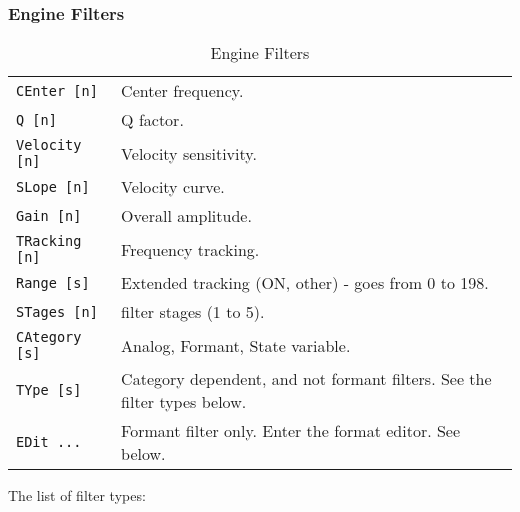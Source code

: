 \subsubsection{Engine Filters}
\label{subsec:command_line_engine_filters}

   \begin{table}[H]
      \centering
      \caption{Engine Filters}
      \label{table:yoshimi_engine_filters}
      \begin{tabular}{l l}
\texttt{CEnter [n]} &
   Center frequency. \\
\texttt{Q [n]} &
   Q factor.   \\
\texttt{Velocity [n]} &
   Velocity sensitivity.   \\
\texttt{SLope [n]} &
   Velocity curve.   \\
\texttt{Gain [n]} &
   Overall amplitude.   \\
\texttt{TRacking [n]} &
   Frequency tracking.  \\
\texttt{Range [s]} &
   Extended tracking (ON, {other}) - goes from 0 to 198. \\
\texttt{STages [n]} &
   filter stages (1 to 5). \\
\texttt{CAtegory [s]} &
   Analog, Formant, State variable. \\
\texttt{TYpe [s]} &
   Category dependent, and not formant filters.  See the filter types below.   \\
\texttt{EDit ...} &
   Formant filter only. Enter the format editor. See below.   \\
      \end{tabular}
   \end{table}

   The list of filter types:

